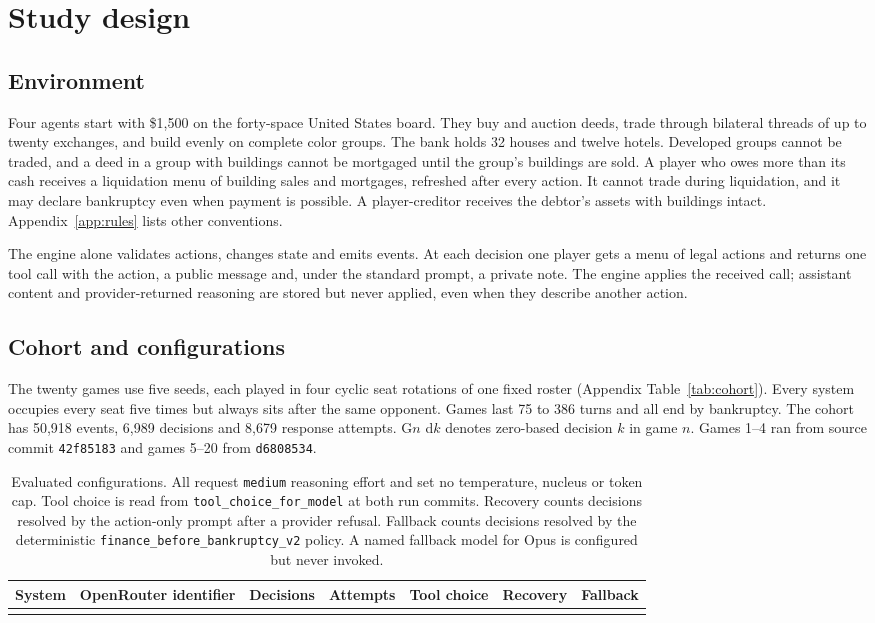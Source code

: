 \section{Study design}
\label{sec:design}

\subsection{Environment}
Four agents start with \$1,500 on the forty-space United States board. They buy and auction deeds, trade through bilateral threads of up to twenty exchanges, and build evenly on complete color groups. The bank holds 32 houses and twelve hotels. Developed groups cannot be traded, and a deed in a group with buildings cannot be mortgaged until the group's buildings are sold. A player who owes more than its cash receives a liquidation menu of building sales and mortgages, refreshed after every action. It cannot trade during liquidation, and it may declare bankruptcy even when payment is possible. A player-creditor receives the debtor's assets with buildings intact. Appendix~\ref{app:rules} lists other conventions.

The engine alone validates actions, changes state and emits events. At each decision one player gets a menu of legal actions and returns one tool call with the action, a public message and, under the standard prompt, a private note. The engine applies the received call; assistant content and provider-returned reasoning are stored but never applied, even when they describe another action.

\subsection{Cohort and configurations}
The twenty games use five seeds, each played in four cyclic seat rotations of one fixed roster (Appendix Table~\ref{tab:cohort}). Every system occupies every seat five times but always sits after the same opponent. Games last 75 to 386 turns and all end by bankruptcy. The cohort has 50,918 events, 6,989 decisions and 8,679 response attempts. G$n$ d$k$ denotes zero-based decision $k$ in game $n$. Games 1--4 ran from source commit \texttt{42f85183} and games 5--20 from \texttt{d6808534}.

\begin{table}[t]\centering\small
\begin{tabularx}{\linewidth}{@{}lYrrcrr@{}}\toprule
System & OpenRouter identifier & Decisions & Attempts & Tool choice & Recovery & Fallback\\\midrule
{}
\bottomrule\end{tabularx}
\caption{Evaluated configurations. All request \texttt{medium} reasoning effort and set no temperature, nucleus or token cap. Tool choice is read from \texttt{tool\_choice\_for\_model} at both run commits. Recovery counts decisions resolved by the action-only prompt after a provider refusal. Fallback counts decisions resolved by the deterministic \texttt{finance\_before\_bankruptcy\_v2} policy. A named fallback model for Opus is configured but never invoked.}
\label{tab:config}\end{table}

